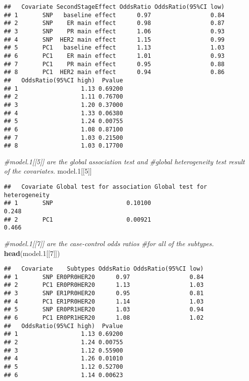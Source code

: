 \documentclass[11pt,]{article}
\newenvironment{Shaded}{\begin{snugshade}}{\end{snugshade}}
\newcommand{\KeywordTok}[1]{\textcolor[rgb]{0.13,0.29,0.53}{\textbf{#1}}}
\newcommand{\DecValTok}[1]{\textcolor[rgb]{0.00,0.00,0.81}{#1}}
\newcommand{\CommentTok}[1]{\textcolor[rgb]{0.56,0.35,0.01}{\textit{#1}}}
\newcommand{\NormalTok}[1]{#1}
\begin{document}
\begin{verbatim}
##   Covariate SecondStageEffect OddsRatio OddsRatio(95%CI low)
## 1       SNP   baseline effect      0.97                 0.84
## 2       SNP    ER main effect      0.98                 0.87
## 3       SNP    PR main effect      1.06                 0.93
## 4       SNP  HER2 main effect      1.15                 0.99
## 5       PC1   baseline effect      1.13                 1.03
## 6       PC1    ER main effect      1.01                 0.93
## 7       PC1    PR main effect      0.95                 0.88
## 8       PC1  HER2 main effect      0.94                 0.86
##   OddsRatio(95%CI high)  Pvalue
## 1                  1.13 0.69200
## 2                  1.11 0.76700
## 3                  1.20 0.37000
## 4                  1.33 0.06380
## 5                  1.24 0.00755
## 6                  1.08 0.87100
## 7                  1.03 0.21500
## 8                  1.03 0.17700
\end{verbatim}

\begin{Shaded}
\begin{Highlighting}[]
\CommentTok{#model.1[[5]] are the global association test and }
\CommentTok{#global heterogeneity test result of the covariates.}
\NormalTok{model.}\DecValTok{1}\NormalTok{[[}\DecValTok{5}\NormalTok{]]}
\end{Highlighting}
\end{Shaded}

\begin{verbatim}
##   Covariate Global test for association Global test for heterogeneity
## 1       SNP                     0.10100                         0.248
## 2       PC1                     0.00921                         0.466
\end{verbatim}

\begin{Shaded}
\begin{Highlighting}[]
\CommentTok{#model.1[[7]] are the case-control odds ratios }
\CommentTok{#for all of the subtypes.}
\KeywordTok{head}\NormalTok{(model.}\DecValTok{1}\NormalTok{[[}\DecValTok{7}\NormalTok{]])}
\end{Highlighting}
\end{Shaded}

\begin{verbatim}
##   Covariate    Subtypes OddsRatio OddsRatio(95%CI low)
## 1       SNP ER0PR0HER20      0.97                 0.84
## 2       PC1 ER0PR0HER20      1.13                 1.03
## 3       SNP ER1PR0HER20      0.95                 0.81
## 4       PC1 ER1PR0HER20      1.14                 1.03
## 5       SNP ER0PR1HER20      1.03                 0.94
## 6       PC1 ER0PR1HER20      1.08                 1.02
##   OddsRatio(95%CI high)  Pvalue
## 1                  1.13 0.69200
## 2                  1.24 0.00755
## 3                  1.12 0.55900
## 4                  1.26 0.01010
## 5                  1.12 0.52700
## 6                  1.14 0.00623
\end{verbatim}
\end{document}
